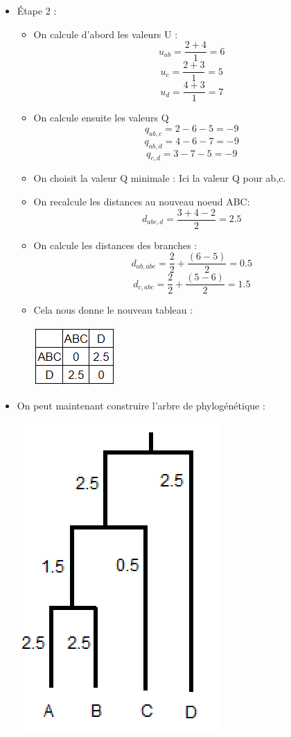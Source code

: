 \documentclass[
	12pt, %
]{fphw}
\begin{document}
\begin{center}
\begin{itemize}
\begin{itemize}
\begin{center}
				\end{center}
			\end{itemize}
		\item Étape 2 :
			\begin{itemize}
			\item On calcule d'abord les valeurs U :
				\[ u_{ab} = \frac{2+4}{1} = 6 \]
				\[ u_{c} = \frac{2+3}{1} = 5 \]
				\[ u_{d} = \frac{4+3}{1} = 7 \]
			\item On calcule ensuite les valeurs Q
				\[ q_{ab,c} = 2-6-5 = -9 \]
				\[ q_{ab,d} = 4-6-7 = -9 \]
				\[ q_{c,d} = 3-7-5 = -9 \]
			\item On choisit la valeur Q minimale : Ici la valeur Q pour ab,c.
			\item On recalcule les distances au nouveau noeud ABC:
				\[ d_{abc,d} = \frac{3+4-2}{2} = 2.5 \]
			\item On calcule les distances des branches :
				\[ d_{ab,abc} = \frac{2}{2} + \frac{(6-5)}{2} = 0.5 \]
				\[ d_{c,abc} = \frac{2}{2} + \frac{(5-6)}{2} = 1.5 \]
			\item Cela nous donne le nouveau tableau :
				\begin{center}
					\includegraphics[width=0.5\columnwidth]{mat3.png} 
				\end{center}
			\end{itemize}
		\item On peut maintenant construire l'arbre de phylogénétique :
			\begin{center}
				\includegraphics[width=0.5\columnwidth]{arbre.png} 
			\end{center}
	\end{itemize}
	\
\end{center}

\end{document}
